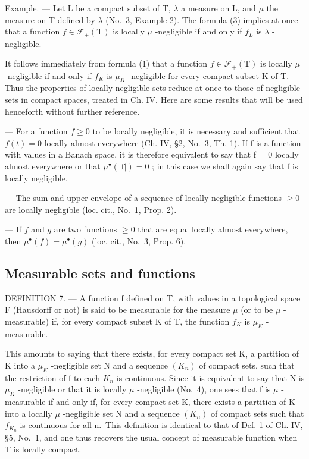 Example. --- Let L be a compact subset of T, \(\lambda\) a measure on L, and \(\mu\) the measure on T defined by \(\lambda\) (No.~3, Example 2). The formula (3) implies at once that a function \(f \in \mathcal{F}_{+}(\mathrm{T})\) is locally \(\mu\) -negligible if and only if \(f_{L}\) is \(\lambda\) -negligible.

It follows immediately from formula (1) that a function \(f \in \mathcal{F}_{+}(\mathrm{T})\) is locally \(\mu\) -negligible if and only if \(f_{K}\) is \(\mu_{K}\) -negligible for every compact subset K of T. Thus the properties of locally negligible sets reduce at once to those of negligible sets in compact spaces, treated in Ch. IV. Here are some results that will be used henceforth without further reference.

--- For a function \(f \geqslant 0\) to be locally negligible, it is necessary and sufficient that \(f(t) = 0\) locally almost everywhere (Ch. IV, §2, No.~3, Th. 1). If f is a function with values in a Banach space, it is therefore equivalent to say that f = 0 locally almost everywhere or that \(\mu^{\bullet}(|\mathbf{f}|) = 0\) ; in this case we shall again say that f is locally negligible.

--- The sum and upper envelope of a sequence of locally negligible functions \(\geqslant0\) are locally negligible (loc. cit., No.~1, Prop. 2).

--- If \(f\) and \(g\) are two functions \(\geqslant 0\) that are equal locally almost everywhere, then \(\mu^{\bullet}(f) = \mu^{\bullet}(g)\) (loc. cit., No.~3, Prop. 6).

\subsection{Measurable sets and functions}

DEFINITION 7. --- A function f defined on T, with values in a topological space F (Hausdorff or not) is said to be measurable for the measure \(\mu\) (or to be \(\mu\) -measurable) if, for every compact subset K of T, the function \(f_{K}\) is \(\mu_{K}\) -measurable.

This amounts to saying that there exists, for every compact set K, a partition of K into a \(\mu_{K}\) -negligible set N and a sequence \((K_{n})\) of compact sets, such that the restriction of f to each \(K_{n}\) is continuous. Since it is equivalent to say that N is \(\mu_{K}\) -negligible or that it is locally \(\mu\) -negligible (No.~4), one sees that f is \(\mu\) -measurable if and only if, for every compact set K, there exists a partition of K into a locally \(\mu\) -negligible set N and a sequence \((K_{n})\) of compact sets such that \(f_{K_{n}}\) is continuous for all n.~This definition is identical to that of Def. 1 of Ch. IV, §5, No.~1, and one thus recovers the usual concept of measurable function when T is locally compact.

